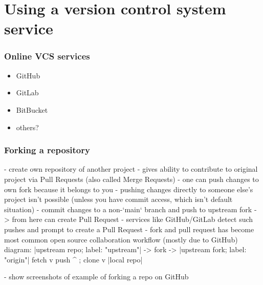 \documentclass{git_course}
\begin{document}
\section{Using a version control system service}

\begin{frame}
    \frametitle{Online VCS services}
    \begin{itemize}
        \item GitHub
        \item GitLab
        \item BitBucket
        \item others?
    \end{itemize}
\end{frame}

\begin{frame}
    \frametitle{Forking a repository}

    - create own repository of another project
    - gives ability to contribute to original project via Pull Requests
    (also called Merge Requests)
    - one can push changes to own fork because it belongs to you
    - pushing changes directly to someone else's project isn't possible
    (unless you have commit access, which isn't default situation)
    - commit changes to a non-`main` branch and push to upstream fork ->
    from here can create Pull Request
    - services like GitHub/GitLab detect such pushes and prompt to create a
    Pull Request
    - fork and pull request has become most common open source collaboration
    workflow (mostly due to GitHub)
    diagram:
    |upstream repo; label: "upstream"|  -> fork -> |upstream fork; label: "origin"|
                        fetch v                            push ^ ; clone v
                                                   |local repo|

    - show screenshots of example of forking a repo on GitHub
\end{frame}
\end{document}
